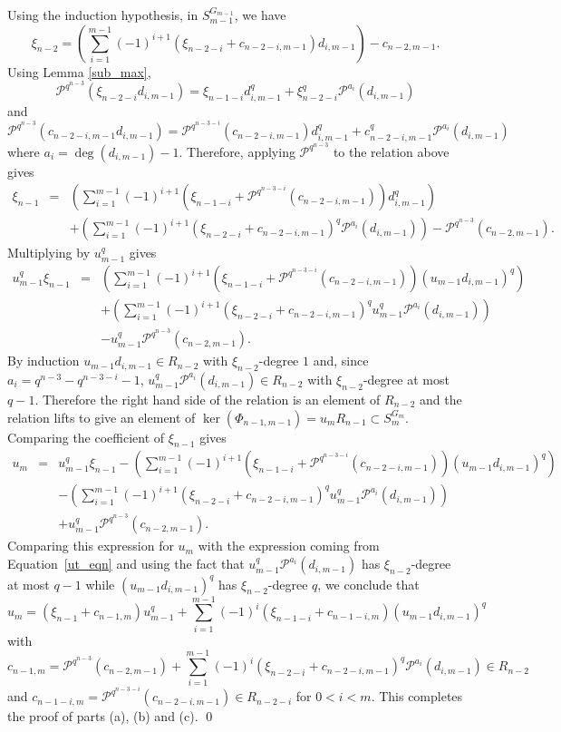 \documentclass{amsart}
\newcommand{\PP}{\mathcal{P}}
\begin{document}
Using the induction hypothesis, in $S_{m-1}^{G_{m-1}}$, we have
 $$\xi_{n-2}=\left(\sum_{i=1}^{m-1}(-1)^{i+1}(\xi_{n-2-i}+c_{n-2-i,m-1})d_{i,m-1}\right)-c_{n-2,m-1}.$$
 Using Lemma \ref{sub_max}, 
 $$\PP^{q^{n-3}}(\xi_{n-2-i}d_{i,m-1})=\xi_{n-1-i}d_{i,m-1}^q+\xi_{n-2-i}^q\PP^{a_i}(d_{i,m-1})$$
and
 $$\PP^{q^{n-3}}(c_{n-2-i,m-1}d_{i,m-1})=\PP^{q^{n-3-i}}(c_{n-2-i,m-1})d_{i,m-1}^q+c_{n-2-i,m-1}^q\PP^{a_i}(d_{i,m-1})$$
 where $a_i=\deg(d_{i,m-1})-1$. Therefore, applying $\PP^{q^{n-3}}$ to the relation above gives
 \begin{eqnarray*}
 \xi_{n-1}&=&\left(\sum_{i=1}^{m-1}(-1)^{i+1}(\xi_{n-1-i}+\PP^{q^{n-3-i}}(c_{n-2-i,m-1}))d_{i,m-1}^q\right)\\
 &&+ \left(\sum_{i=1}^{m-1}(-1)^{i+1}(\xi_{n-2-i}+c_{n-2-i,m-1})^q \PP^{a_i}(d_{i,m-1})\right)-\PP^{q^{n-3}}(c_{n-2,m-1}).
 \end{eqnarray*}
Multiplying by $u_{m-1}^q$ gives
\begin{eqnarray*}
 u_{m-1}^q\xi_{n-1}&=&\left(\sum_{i=1}^{m-1}(-1)^{i+1}(\xi_{n-1-i}+\PP^{q^{n-3-i}}(c_{n-2-i,m-1}))(u_{m-1}d_{i,m-1})^q\right)\\
 &&+ \left(\sum_{i=1}^{m-1}(-1)^{i+1}(\xi_{n-2-i}+c_{n-2-i,m-1})^q u_{m-1}^q\PP^{a_i}(d_{i,m-1})\right)\\
 &&-u_{m-1}^q\PP^{q^{n-3}}(c_{n-2,m-1}).
 \end{eqnarray*}
By induction $u_{m-1}d_{i,m-1}\in R_{n-2}$ with $\xi_{n-2}$-degree $1$
and, since $a_i=q^{n-3}-q^{n-3-i}-1$, $u_{m-1}^q\PP^{a_i}(d_{i,m-1})\in R_{n-2}$ with $\xi_{n-2}$-degree at most $q-1$.
Therefore the right hand side of the relation is an element of $R_{n-2}$ and the relation lifts to give an element of
$\ker(\Phi_{n-1,m-1})=u_mR_{n-1}\subset S_m^{G_m}$. 
Comparing the coefficient of $\xi_{n-1}$ gives
\begin{eqnarray*}
 u_m&=&u_{m-1}^q\xi_{n-1}-\left(\sum_{i=1}^{m-1}(-1)^{i+1}(\xi_{n-1-i}+\PP^{q^{n-3-i}}(c_{n-2-i,m-1}))(u_{m-1}d_{i,m-1})^q\right)\\
 &&-\left(\sum_{i=1}^{m-1}(-1)^{i+1}(\xi_{n-2-i}+c_{n-2-i,m-1})^q u_{m-1}^q\PP^{a_i}(d_{i,m-1})\right)\\
 &&+u_{m-1}^q\PP^{q^{n-3}}(c_{n-2,m-1}).
 \end{eqnarray*}
Comparing this expression for $u_m$ with the expression coming from Equation~\ref{ut_eqn}
and using the fact that $u_{m-1}^q\PP^{a_i}(d_{i,m-1})$ 
has $\xi_{n-2}$-degree at most $q-1$ while 
$(u_{m-1}d_{i,m-1})^q$ has $\xi_{n-2}$-degree $q$, we conclude that
$$u_m=(\xi_{n-1}+c_{n-1,m})u_{m-1}^q+\sum_{i=1}^{m-1}(-1)^i(\xi_{n-1-i}+c_{n-1-i,m})(u_{m-1}d_{i,m-1})^q$$
with $$ c_{n-1,m}=\PP^{q^{n-3}}(c_{n-2,m-1})+\sum_{i=1}^{m-1}(-1)^{i}(\xi_{n-2-i}+c_{n-2-i,m-1})^q \PP^{a_i}(d_{i,m-1})\in R_{n-2}$$
and $c_{n-1-i,m}=\PP^{q^{n-3-i}}(c_{n-2-i,m-1})\in R_{n-2-i}$ for $0<i<m$. This completes the proof of parts (a), (b) and (c).   \qed
\end{document}
